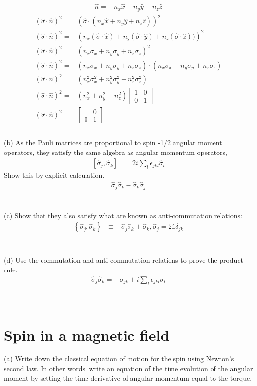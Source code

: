 \documentclass[12pt, a4paper]{article}
\begin{document}
\begin{align*}
\hat{n} =& n_x\hat{x} + n_y\hat{y} + n_z\hat{z}
\end{align*}
\begin{align*}
(\hat{\sigma}\cdot\hat{n})^2 =& 
\left(\hat{\sigma} \cdot (n_x\hat{x} + n_y\hat{y} + n_z\hat{z})\right)^2
\\
(\hat{\sigma}\cdot\hat{n})^2 =& 
\left(n_x (\hat{\sigma}\cdot\hat{x}) + n_y(\hat{\sigma}\cdot\hat{y}) + n_z(\hat{\sigma}\cdot\hat{z}))\right)^2
\\
(\hat{\sigma}\cdot\hat{n})^2 =& 
\left(n_x\sigma_x + n_y\sigma_y + n_z\sigma_z\right)^2
\\
(\hat{\sigma}\cdot\hat{n})^2 =& 
\left(n_x\sigma_x + n_y\sigma_y + n_z\sigma_z\right)
\cdot \left(n_x\sigma_x + n_y\sigma_y + n_z\sigma_z\right)
\\
(\hat{\sigma}\cdot\hat{n})^2 =& 
\left(n_x^2\sigma_x^2 + n_y^2\sigma_y^2 + n_z^2\sigma_z^2\right)
\\
(\hat{\sigma}\cdot\hat{n})^2 =& 
\left(n_x^2 + n_y^2 + n_z^2\right)
\begin{bmatrix}
1&0\\0&1
\end{bmatrix}
\\
(\hat{\sigma}\cdot\hat{n})^2 =& 
\begin{bmatrix}
1&0\\0&1
\end{bmatrix}
\\
\end{align*}
\\
(b) As the Pauli matrices are proportional to spin -1/2 angular moment operators, they satisfy the same algebra as angular momentum operators,
\begin{align*}
\left[\hat{\sigma}_j,\hat{\sigma}_k\right] =& 2i\sum_l \epsilon_{jkl}\hat{\sigma}_l
\end{align*}
Show this by explicit calculation.
\begin{align*}
\hat{\sigma}_j\hat{\sigma}_k - \hat{\sigma}_k\hat{\sigma}_j
\end{align*}
\\
\\
(c) Show that they also satisfy what are known as anti-commutation relations:
\begin{align*}
\left\{\hat{\sigma}_j,\hat{\sigma}_k\right\}_+ \equiv& \hat{\sigma}_j \hat{\sigma}_k + \hat{\sigma}_k,\hat{\sigma}_j = 2\mathds{1}\delta_{jk}
\end{align*}
\\
\\
(d) Use the commutation and anti-commutation relations to prove the product rule:
\begin{align*}
\hat{\sigma}_j \hat{\sigma}_k =& \sigma_{jk} + i\sum_l \epsilon_{jkl}\sigma_l
\end{align*}
\\
\\
\section{Spin in a magnetic field}

(a) Write down the classical equation of motion for the spin using Newton's second law. In other words, write an equation of the time evolution of the angular moment by setting the time
derivative of angular momentum equal to the torque.
\end{document}
